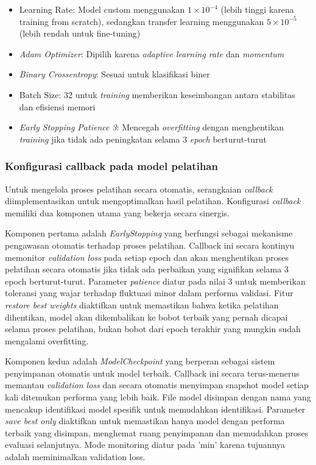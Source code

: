\begin{itemize}
    \item Learning Rate: Model custom menggunakan $1 \times 10^{-4}$ (lebih tinggi karena training from scratch), sedangkan transfer learning menggunakan $5 \times 10^{-5}$ (lebih rendah untuk fine-tuning)   
    \item \textit{Adam Optimizer}: Dipilih karena \textit{adaptive learning rate} dan \textit{momentum}
    \item \textit{Binary Crossentropy}: Sesuai untuk klasifikasi biner 
    \item Batch Size: 32 untuk \textit{training} memberikan keseimbangan antara stabilitas dan efisiensi memori
    \item \textit{Early Stopping Patience 3}: Mencegah \textit{overfitting} dengan menghentikan \textit{training} jika tidak ada peningkatan selama 3 \textit{epoch} berturut-turut
\end{itemize}

\subsubsection{Konfigurasi callback pada model pelatihan}

Untuk mengelola proses pelatihan secara otomatis, serangkaian \textit{callback} diimplementasikan untuk mengoptimalkan hasil pelatihan. Konfigurasi \textit{callback} memiliki dua komponen utama yang bekerja secara sinergis.

Komponen pertama adalah \textit{EarlyStopping} yang berfungsi sebagai mekanisme pengawasan otomatis terhadap proses pelatihan. Callback ini secara kontinyu memonitor \textit{validation loss} pada setiap epoch dan akan menghentikan proses pelatihan secara otomatis jika tidak ada perbaikan yang signifikan selama 3 epoch berturut-turut. Parameter \textit{patience} diatur pada nilai 3 untuk memberikan toleransi yang wajar terhadap fluktuasi minor dalam performa validasi. Fitur \textit{restore best weights} diaktifkan untuk memastikan bahwa ketika pelatihan dihentikan, model akan dikembalikan ke bobot terbaik yang pernah dicapai selama proses pelatihan, bukan bobot dari epoch terakhir yang mungkin sudah mengalami overfitting.

Komponen kedua adalah \textit{ModelCheckpoint} yang berperan sebagai sistem penyimpanan otomatis untuk model terbaik. Callback ini secara terus-menerus memantau \textit{validation loss} dan secara otomatis menyimpan snapshot model setiap kali ditemukan performa yang lebih baik. File model disimpan dengan nama yang mencakup identifikasi model spesifik untuk memudahkan identifikasi. Parameter \textit{save best only} diaktifkan untuk memastikan hanya model dengan performa terbaik yang disimpan, menghemat ruang penyimpanan dan memudahkan proses evaluasi selanjutnya. Mode monitoring diatur pada 'min' karena tujuannya adalah meminimalkan validation loss.

